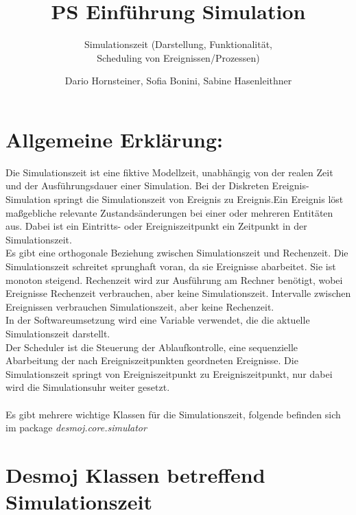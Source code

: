 \documentclass[runningheads]{llncs}
\begin{document}
\title{PS Einführung Simulation}
\subtitle{Simulationszeit (Darstellung, Funktionalität, \\ Scheduling von Ereignissen/Prozessen)}
\author{Dario Hornsteiner, Sofia Bonini, Sabine Hasenleithner}
\maketitle

\section{Allgemeine Erklärung:}
Die Simulationszeit ist eine fiktive Modellzeit, unabhängig von der realen Zeit und der Ausführungsdauer einer Simulation. Bei der Diskreten Ereignis-Simulation springt die Simulationszeit von Ereignis zu Ereignis.Ein Ereignis löst maßgebliche relevante Zustandsänderungen bei einer oder mehreren Entitäten aus. Dabei ist ein Eintritts- oder Ereigniszeitpunkt ein Zeitpunkt in der Simulationszeit.\\
Es gibt eine orthogonale Beziehung zwischen Simulationszeit und Rechenzeit. Die Simulationszeit schreitet sprunghaft voran, da sie Ereignisse abarbeitet. Sie ist monoton steigend. Rechenzeit wird zur Ausführung am Rechner benötigt, wobei Ereignisse Rechenzeit verbrauchen, aber keine Simulationszeit. Intervalle zwischen Ereignissen verbrauchen Simulationszeit, aber keine Rechenzeit.\\
In der Softwareumsetzung wird eine Variable verwendet, die die  aktuelle Simulationszeit darstellt. \\
Der Scheduler ist die Steuerung der Ablaufkontrolle, eine sequenzielle Abarbeitung
der nach Ereigniszeitpunkten geordneten Ereignisse. Die Simulationszeit springt von Ereigniszeitpunkt zu Ereigniszeitpunkt, nur dabei wird die Simulationsuhr weiter gesetzt.\\
 \\
Es gibt mehrere wichtige Klassen für die Simulationszeit, folgende befinden sich im package \textit{desmoj.core.simulator}\\

\section{Desmoj Klassen betreffend Simulationszeit}
\end{document}
